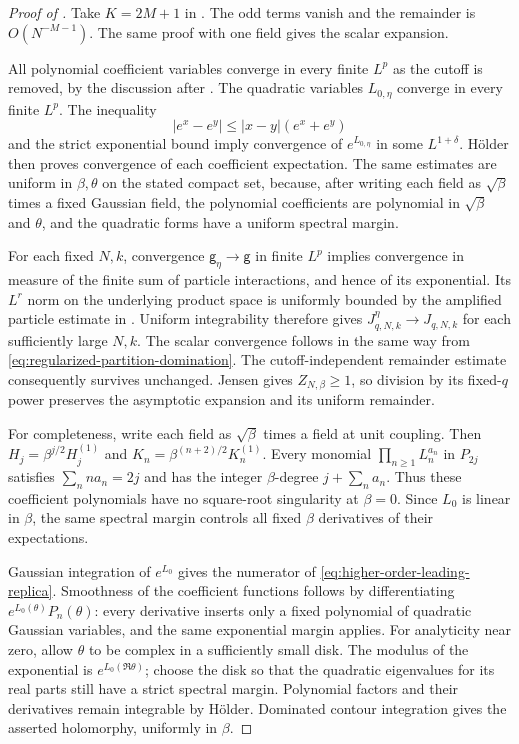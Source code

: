 \documentclass[11pt,reqno]{amsart}
\numberwithin{equation}{section}
\theoremstyle{plain}
\theoremstyle{definition}
\newcommand{\be}{\beta}
\newcommand{\g}{\mathsf g}
\begin{document}
\begin{proof}[Proof of ]
Take $K=2M+1$ in . The odd terms vanish and the remainder is $O(N^{-M-1})$. The same proof with one field gives the scalar expansion.

All polynomial coefficient variables converge in every finite $L^p$ as the cutoff is removed, by the discussion after . The quadratic variables $L_{0,\eta}$ converge in every finite $L^p$. The inequality
\begin{equation}\label{eq:exponential-continuity}
 |e^x-e^y|\leq |x-y|(e^x+e^y)
\end{equation}
and the strict exponential bound imply convergence of $e^{L_{0,\eta}}$ in some $L^{1+\delta}$. H\"older then proves convergence of each coefficient expectation. The same estimates are uniform in $\be,\theta$ on the stated compact set, because, after writing each field as $\sqrt{\be}$ times a fixed Gaussian field, the polynomial coefficients are polynomial in $\sqrt{\be}$ and $\theta$, and the quadratic forms have a uniform spectral margin.

For each fixed $N,k$, convergence $\g_\eta\to \g$ in finite $L^p$ implies convergence in measure of the finite sum of particle interactions, and hence of its exponential. Its $L^r$ norm on the underlying product space is uniformly bounded by the amplified particle estimate in . Uniform integrability therefore gives $J_{q,N,k}^{\eta}\to J_{q,N,k}$ for each sufficiently large $N,k$. The scalar convergence follows in the same way from \eqref{eq:regularized-partition-domination}. The cutoff-independent remainder estimate consequently survives unchanged. Jensen gives $Z_{N,\be}\geq1$, so division by its fixed-$q$ power preserves the asymptotic expansion and its uniform remainder.

For completeness, write each field as $\sqrt{\be}$ times a field at unit coupling. Then $H_j=\be^{j/2}H_j^{(1)}$ and $K_n=\be^{(n+2)/2}K_n^{(1)}$. Every monomial $\prod_{n\geq1}L_n^{a_n}$ in $P_{2j}$ satisfies $\sum_n n a_n=2j$ and has the integer $\be$-degree $j+\sum_n a_n$. Thus these coefficient polynomials have no square-root singularity at $\be=0$. Since $L_0$ is linear in $\be$, the same spectral margin controls all fixed $\be$ derivatives of their expectations.

Gaussian integration of $e^{L_0}$ gives the numerator of \eqref{eq:higher-order-leading-replica}. Smoothness of the coefficient functions follows by differentiating $e^{L_0(\theta)}P_n(\theta)$: every derivative inserts only a fixed polynomial of quadratic Gaussian variables, and the same exponential margin applies. For analyticity near zero, allow $\theta$ to be complex in a sufficiently small disk. The modulus of the exponential is $e^{L_0(\Re\theta)}$; choose the disk so that the quadratic eigenvalues for its real parts still have a strict spectral margin. Polynomial factors and their derivatives remain integrable by H\"older. Dominated contour integration gives the asserted holomorphy, uniformly in $\be$.
\end{proof}
\end{document}
